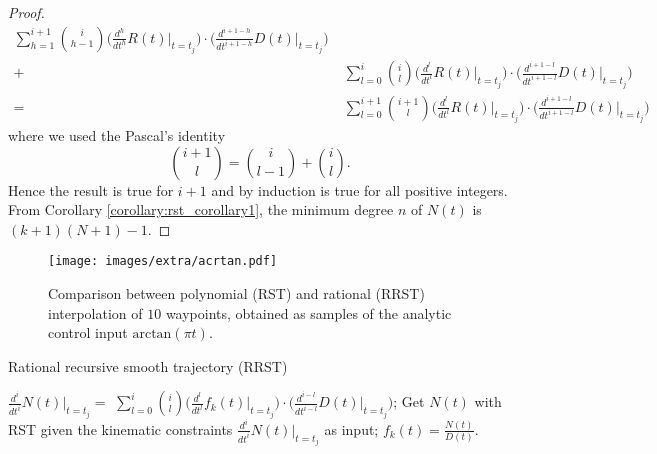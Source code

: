 \begin{proof}
\begin{align}
   \sum_{h=1}^{i+1}{\binom{i}{h-1} \biggr(\frac{d^{h}}{dt^{h}}R(t)\bigr|_{t=t_j}\biggr) \cdot \biggr(\frac{d^{i+1-h}}{dt^{i+1-h}}D(t)\bigr|_{t=t_j}}\biggr) \nonumber \\
+ &\; \sum_{l=0}^{i}{\binom{i}{l} \biggr(\frac{d^{l}}{dt^{l}}R(t)\bigr|_{t=t_j}\biggr) \cdot \biggr(\frac{d^{i+1-l}}{dt^{i+1-l}}D(t)\bigr|_{t=t_j}}\biggr) \nonumber \\ 
= &\; \sum_{l=0}^{i+1}{\binom{i+1}{l}\biggr(\frac{d^l}{dt^l}R(t)\bigr|_{t=t_j}\biggr) \cdot \biggr(\frac{d^{i+1-l}}{dt^{i+1-l}}D(t)\bigr|_{t=t_j}}\biggr)
\end{align}
where we used the Pascal's identity
\begin{equation}
\binom{i+1}{l} = \binom{i}{l-1} + \binom{i}{l}.
\end{equation}
Hence the result is true for $i+1$ and by induction is true for all positive integers. From Corollary \ref{corollary:rst_corollary1}, the minimum degree $n$ of $N(t)$ is $(k+1)(N+1)-1$.
\qedhere
\end{proof}

\begin{figure}[b]
\texttt{[image: images/extra/acrtan.pdf]}
      \centering
      \caption{Comparison between polynomial (RST) and rational (RRST) interpolation of $10$ waypoints, obtained as samples of the analytic control input $\text{arctan}(\pi t)$.}
      \label{fig:rst_arctan}
\end{figure}

\begin{algorithm}
\caption{Rational recursive smooth trajectory (RRST)}
\label{alg:rst_RRST}
\begin{algorithmic}[1]
		\State $\frac{d^i}{dt^i}N(t)\biggr|_{t=t_j} =$
          \State $\sum_{l=0}^{i}{\binom{i}{l}\biggr(\frac{d^l}{dt^l}f_k(t)\bigr|_{t=t_j}\biggr) \cdot \biggr(\frac{d^{i-l}}{dt^{i-l}}D(t)\bigr|_{t=t_j}}\biggr)$;
	\EndFor
\EndFor
\State Get $N(t)$ with RST given the kinematic constraints $\frac{d^i}{dt^i}N(t)\biggr|_{t=t_j}$ as input;
\State $f_k(t)=\frac{N(t)}{D(t)}$.
\end{algorithmic}
\end{algorithm}


